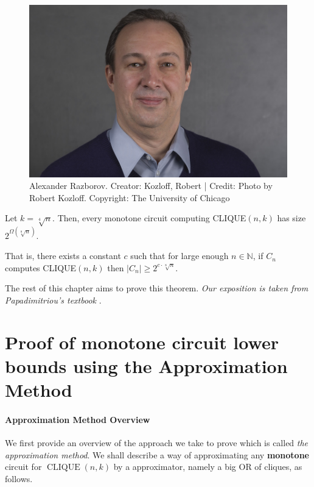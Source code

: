 \begin{figure}
    \centering
    \includegraphics[width=0.3\linewidth]{images/RAZBOROV_Alexander.jpeg}
    \caption{Alexander Razborov. Creator: Kozloff, Robert | Credit: Photo by Robert Kozloff.
Copyright: The University of Chicago}
    \label{fig:enter-label}
\end{figure}


\begin{tcolorbox}[colframe=white, colback=blue!5, boxrule=0mm, sharp corners]
\begin{theorem}\label{thm:razborov} Let $k=\sqrt[4]{n}$. Then, every monotone circuit computing {\rm CLIQUE}$(n, k)$ has size $2^{\Omega(\sqrt[8]{n})}$.
\end{theorem}
\end{tcolorbox}
That is, there exists a constant $c$ such that  for large enough $n \in \mathbb{N}$, if $C_n$ computes CLIQUE$(n,k)$ then $\left|C_n\right| \geq 2^{c \cdot \sqrt[8]{n}}$.


The rest of this chapter aims to prove this theorem. \textit{Our exposition is taken from Papadimitriou's textbook} \cite{Pap94}.






\section{Proof of monotone circuit lower bounds  using the Approximation Method}


\paragraph{Approximation Method Overview}

We first provide an overview of the approach we take to prove  which is called \emph{the approximation method}. 
We shall describe a way of approximating any \textbf{monotone} circuit for $\operatorname{CLIQUE}({n}, {k})$ by a approximator, namely a big OR of cliques, as follows.
 

